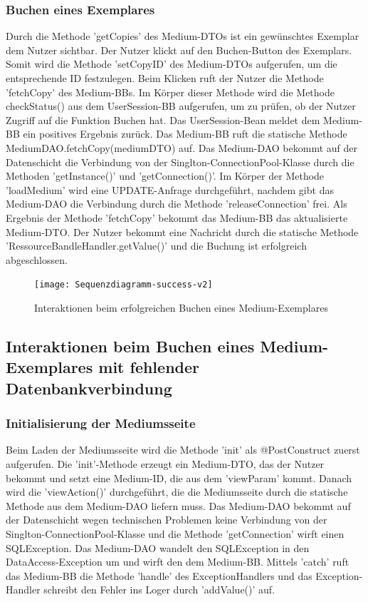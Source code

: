 \documentclass{article}
\begin{document}
\subsubsection{Buchen eines Exemplares}
Durch die Methode 'getCopies' des Medium-DTOs ist ein gewünschtes Exemplar dem Nutzer sichtbar. Der Nutzer klickt auf den Buchen-Button des Exemplars. Somit wird die Methode 'setCopyID' des Medium-DTOs aufgerufen, um die entsprechende ID festzulegen. Beim Klicken ruft der Nutzer die Methode 'fetchCopy' des Medium-BBs. Im Körper dieser Methode wird die Methode checkStatus() aus dem UserSession-BB aufgerufen, um zu prüfen, ob der Nutzer Zugriff auf die Funktion Buchen hat. Das UserSession-Bean meldet dem Medium-BB ein positives Ergebnis zurück. Das Medium-BB ruft die statische Methode MediumDAO.fetchCopy(mediumDTO) auf. Das Medium-DAO bekommt auf der Datenschicht die Verbindung von der Singlton-ConnectionPool-Klasse durch die Methoden 'getInstance()' und 'getConnection()'. Im Körper der Methode 'loadMedium' wird eine UPDATE-Anfrage durchgeführt, nachdem gibt das Medium-DAO die Verbindung durch die Methode 'releaseConnection' frei. Als Ergebnis der Methode 'fetchCopy' bekommt das Medium-BB das aktualisierte Medium-DTO. Der Nutzer bekommt eine Nachricht durch die statische Methode 'RessourceBandleHandler.getValue()' und die Buchung ist erfolgreich abgeschlossen.
\newpage
\begin{figure}[h]
    \centering
    \texttt{[image: Sequenzdiagramm-success-v2]}
    \caption{Interaktionen beim erfolgreichen Buchen eines Medium-Exemplares}
    \label{Sequenzdiagramm}
\end{figure}
\restoregeometry

\subsection{Interaktionen beim Buchen eines Medium-Exemplares mit fehlender Datenbankverbindung}
\subsubsection{Initialisierung der Mediumsseite}
Beim Laden der Mediumsseite wird die Methode 'init' als @PostConstruct zuerst aufgerufen. Die 'init'-Methode erzeugt ein Medium-DTO, das der Nutzer bekommt und setzt eine Medium-ID, die aus dem 'viewParam' kommt. Danach wird die 'viewAction()' durchgeführt, die die Mediumsseite durch die statische Methode aus dem Medium-DAO liefern muss. Das Medium-DAO bekommt auf der Datenschicht wegen technischen Problemen keine Verbindung von der Singlton-ConnectionPool-Klasse und die Methode 'getConnection' wirft einen SQLException. Das Medium-DAO wandelt den SQLException in den DataAccess-Exception um und wirft den dem Medium-BB. Mittels 'catch' ruft das Medium-BB die Methode 'handle' des ExceptionHandlers und das Exception-Handler schreibt den Fehler ins Loger durch 'addValue()' auf.
\end{document}

